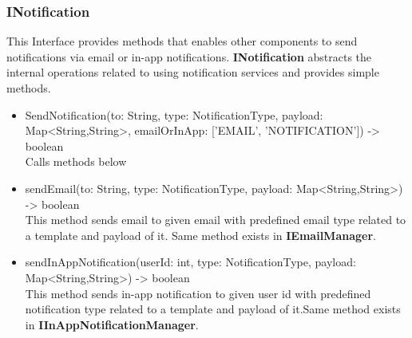 \subsubsection{INotification}
This Interface provides methods that enables other components to send notifications via email or in-app notifications. \textbf{INotification} abstracts the internal operations related to using notification services and provides simple methods.

\begin{itemize}
    \item SendNotification(to: String, type: NotificationType, payload: Map<String,String>, emailOrInApp: ['EMAIL', 'NOTIFICATION']) -> boolean \\
    Calls methods below
    \item sendEmail(to: String, type: NotificationType, payload: Map<String,String>) -> boolean \\ This method sends email to given email with predefined email type related to a template and payload of it. Same method exists in \textbf{IEmailManager}.
    \item sendInAppNotification(userId: int, type: NotificationType, payload: Map<String,String>) -> boolean \\ This method sends in-app notification to given user id with predefined notification type related to a template and payload of it.Same method exists in \textbf{IInAppNotificationManager}.
\end{itemize}
